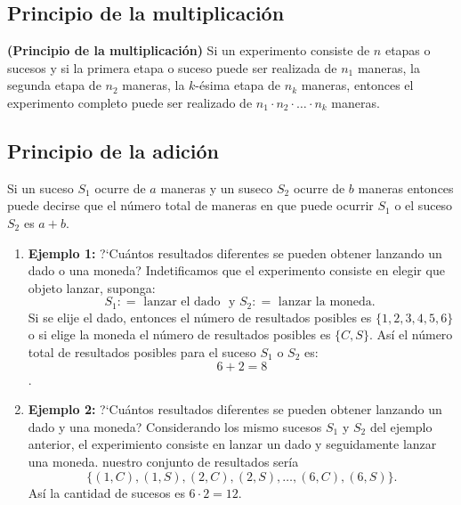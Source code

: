 \subsection{Principio de la multiplicaci\'on}
\begin{definition}{\bf (Principio de la multiplicaci\'on)}
    Si un experimento consiste de $n$ etapas o sucesos y si la primera etapa o suceso puede ser realizada de $n_{1}$ maneras, la segunda
    etapa de $n_{2}$ maneras, la $k$-\'esima etapa de $n_{k}$ maneras, entonces el experimento completo puede ser realizado
    de $n_{1}\cdot n_{2}\cdot\ldots\cdot n_{k}$ maneras.
\end{definition}

\subsection{Principio de la adici\'on}
Si un suceso $S_{1}$  ocurre de $a$ maneras y un suseco $S_{2}$ ocurre de $b$ maneras entonces puede decirse que el n\'umero total de maneras en que puede
ocurrir $S_1$ o el suceso $S_2$ es $a+b$.

\begin{example}
    \hspace{0.5mm}
    \begin{enumerate}[{\rm 1}]
        \item {\bf Ejemplo 1:}  ?`Cu\'antos resultados diferentes se pueden obtener lanzando un dado o una moneda?
        Indetificamos que el experimento consiste en elegir que objeto lanzar, suponga:
        $$ S_1\colon = \text{ lanzar el dado } \text{ y } S_2 \colon = \text{ lanzar la moneda. }$$
        Si se elije el dado, entonces el n\'umero de resultados posibles es $\{1,2,3,4,5,6\}$ o 
        si elige la moneda el n\'umero de resultados posibles es $\{C,S\}$. 
        As\'i el n\'umero total de resultados posibles para el suceso $S_1$ o $S_2$ es: $$6+2=8$$.
        \item {\bf Ejemplo 2:}  ?`Cu\'antos resultados diferentes se pueden obtener lanzando un dado y una moneda?
        Considerando los mismo sucesos $S_1$ y $S_2$ del ejemplo anterior, el experimiento consiste en lanzar un dado y seguidamente lanzar una moneda.
        nuestro conjunto de resultados ser\'ia
        $$ \{ {(1,C), (1,S)}, (2,C), (2,S), \ldots, (6,C), (6,S) \}. $$
        As\'i la cantidad de sucesos es $6\cdot2 = 12.$
        
    \end{enumerate}
\end{example}


